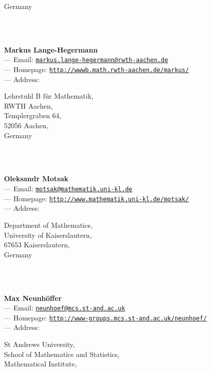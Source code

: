 \documentclass[a4paper,11pt]{report}
\begin{document}
\begin{titlepage}
{\begin{minipage}[t]{8cm}
 Germany \end{minipage}
}\\
{\mbox{}\\
\small \noindent \textbf{Markus Lange-Hegermann\\
    } --- Email: \href{mailto://markus.lange-hegermann@rwth-aachen.de} {\texttt{markus.lange-hegermann@rwth-aachen.de}}\\
 --- Homepage: \href{http://wwwb.math.rwth-aachen.de/~markus/} {\texttt{http://wwwb.math.rwth-aachen.de/\texttt{}markus/}}\\
 --- Address: \begin{minipage}[t]{8cm}\noindent
 Lehrstuhl B f{\"u}r Mathematik, \\
 RWTH Aachen, \\
 Templergraben 64, \\
 52056 Aachen, \\
 Germany \end{minipage}
}\\
{\mbox{}\\
\small \noindent \textbf{Oleksandr Motsak\\
    } --- Email: \href{mailto://motsak@mathematik.uni-kl.de} {\texttt{motsak@mathematik.uni-kl.de}}\\
 --- Homepage: \href{http://www.mathematik.uni-kl.de/~motsak/} {\texttt{http://www.mathematik.uni-kl.de/\texttt{}motsak/}}\\
 --- Address: \begin{minipage}[t]{8cm}\noindent
 Department of Mathematics, \\
 University of Kaiserslautern, \\
 67653 Kaiserslautern, \\
 Germany \end{minipage}
}\\
{\mbox{}\\
\small \noindent \textbf{Max Neunh{\"o}ffer\\
    } --- Email: \href{mailto://neunhoef@mcs.st-and.ac.uk} {\texttt{neunhoef@mcs.st-and.ac.uk}}\\
 --- Homepage: \href{http://www-groups.mcs.st-and.ac.uk/~neunhoef/} {\texttt{http://www-groups.mcs.st-and.ac.uk/\texttt{}neunhoef/}}\\
 --- Address: \begin{minipage}[t]{8cm}\noindent
 St Andrews University, \\
 School of Mathematics and Statistics, \\
 Mathematical Institute, \\

\end{minipage}}
\end{titlepage}
\end{document}
